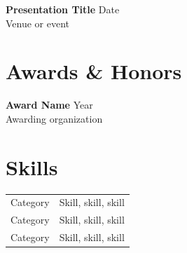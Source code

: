 \documentclass[11pt,a4paper]{article}
\newcommand{\resumeEntry}[4]{%
  \textbf{#1} \hfill #2\\
  #3%
  \if\relax\detokenize{#4}\relax
  \else
    \begin{itemize}
      #4
    \end{itemize}
  \fi
  \vspace{0.25em}
}
\newcommand{\skillrow}[2]{#1 & #2\\}
\begin{document}
\resumeEntry
  {Presentation Title}
  {Date}
  {Venue or event}
  {}

\section{Awards \& Honors}

\resumeEntry
  {Award Name}
  {Year}
  {Awarding organization}
  {}

\section{Skills}

\begin{tabularx}{\textwidth}{@{}p{3cm}X@{}}
  \skillrow{Category}{Skill, skill, skill}
  \skillrow{Category}{Skill, skill, skill}
  \skillrow{Category}{Skill, skill, skill}
\end{tabularx}
\end{document}
